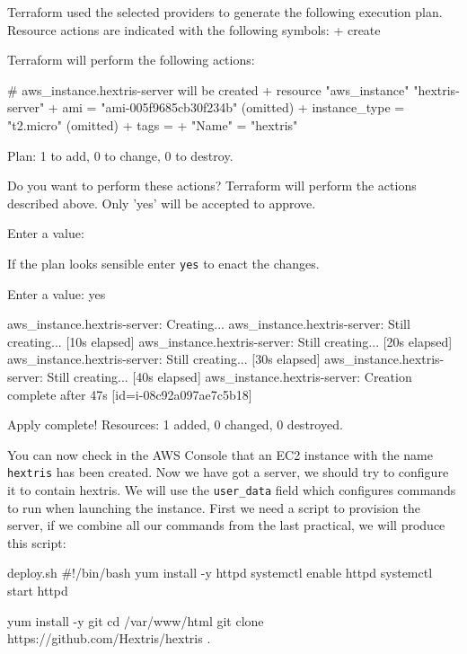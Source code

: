 \documentclass{csse4400}
\begin{document}
\begin{code}[language=terraform-plan]{}
Terraform used the selected providers to generate the following execution plan. Resource actions are indicated with the following symbols:
  + create

Terraform will perform the following actions:

  # aws_instance.hextris-server will be created
  + resource "aws_instance" "hextris-server" {
      + ami                                  = "ami-005f9685cb30f234b"
      (omitted)
      + instance_type                        = "t2.micro"
      (omitted)
      + tags                                 = {
          + "Name" = "hextris"
        }
    }

Plan: 1 to add, 0 to change, 0 to destroy.

Do you want to perform these actions?
  Terraform will perform the actions described above.
  Only 'yes' will be accepted to approve.

  Enter a value: 
\end{code}

If the plan looks sensible enter \texttt{yes} to enact the changes.

\begin{code}[language=terraform-plan]{}
  Enter a value: yes

aws_instance.hextris-server: Creating...
aws_instance.hextris-server: Still creating... [10s elapsed]
aws_instance.hextris-server: Still creating... [20s elapsed]
aws_instance.hextris-server: Still creating... [30s elapsed]
aws_instance.hextris-server: Still creating... [40s elapsed]
aws_instance.hextris-server: Creation complete after 47s [id=i-08c92a097ae7c5b18]

Apply complete! Resources: 1 added, 0 changed, 0 destroyed.
\end{code}

You can now check in the AWS Console that an EC2 instance with the name \texttt{hextris} has been created.
Now we have got a server, we should try to configure it to contain hextris.
We will use the \texttt{user\_data} field which configures commands to run when launching the instance.
First we need a script to provision the server, if we combine all our commands from the last practical, we will produce this script:

\begin{code}[language=bash,numbers=none]{deploy.sh}
#!/bin/bash
yum install -y httpd
systemctl enable httpd
systemctl start httpd

yum install -y git
cd /var/www/html
git clone https://github.com/Hextris/hextris .  
\end{code}
\end{document}
